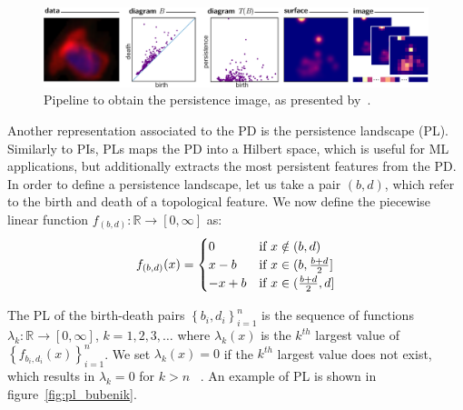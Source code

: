 \documentclass{article}
\begin{document}
\begin{figure}[htb]
  \begin{centering}
    \includegraphics[width=1.0\textwidth]{figures/cartoon.pdf}
    \caption{Pipeline to obtain the persistence image, as presented by~\citet{adams2017persistence}.}
    \label{fig:pipeline_persistence_image}
  \end{centering}
\end{figure}

Another representation associated to the PD is the persistence landscape (PL). Similarly to PIs, PLs
maps the PD into a Hilbert space, which is useful for ML applications, but additionally
extracts the most persistent features from the PD. In order to define a persistence landscape, let
us take a pair $(b,d)$, which refer to the birth and death of a topological feature. We now define
the piecewise linear function $f_{(b,d)}:\mathbb{R} \to [0, \infty]$ as:
\begin{equation}
  \label{eq:piecewise_linear_landscape}
  f_{(b,d)}(x)=
  \begin{cases}
    0 & \text{if }x \notin (b,d)\\ x-b & \text{if }x\in (b,{b+d\over 2}]\\ -x+b & \text{if }x\in
      ({b+d\over 2},d]
  \end{cases}
\end{equation}


The PL of the birth-death pairs $\left\{b_i,d_i\right\}_{i=1}^{n}$ is the sequence of functions
$\lambda_k:\mathbb{R}\to [0,\infty]$, $k=1,2,3,\ldots$ where $\lambda_k(x)$ is the $k^{th}$ largest
value of $\left\{f_{b_i, d_i}(x)\right\}^{n}_{i=1}$. We set $\lambda_k(x)=0$ if the $k^{th}$ largest
value does not exist, which results in $\lambda_k=0$ for $k>n$ ~\citep{bubenik2015statistical,
  bubenik2020persistence}. An example of PL is shown in figure~\ref{fig:pl_bubenik}.
\end{document}
